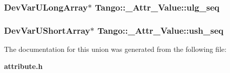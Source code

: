 \subsubsection[{ulg\-\_\-seq}]{\setlength{\rightskip}{0pt plus 5cm}Dev\-Var\-U\-Long\-Array$\ast$ Tango\-::\-\_\-\-Attr\-\_\-\-Value\-::ulg\-\_\-seq}\label{unionTango_1_1__Attr__Value_aefdf14649ed87e9ba3cd496344a2d229}
\subsubsection[{ush\-\_\-seq}]{\setlength{\rightskip}{0pt plus 5cm}Dev\-Var\-U\-Short\-Array$\ast$ Tango\-::\-\_\-\-Attr\-\_\-\-Value\-::ush\-\_\-seq}\label{unionTango_1_1__Attr__Value_ab3b3cc1b40eeefde2c9d0ec7f66682de}


The documentation for this union was generated from the following file\-:\begin{DoxyCompactItemize}
\item 
{\bf attribute.\-h}\end{DoxyCompactItemize}
